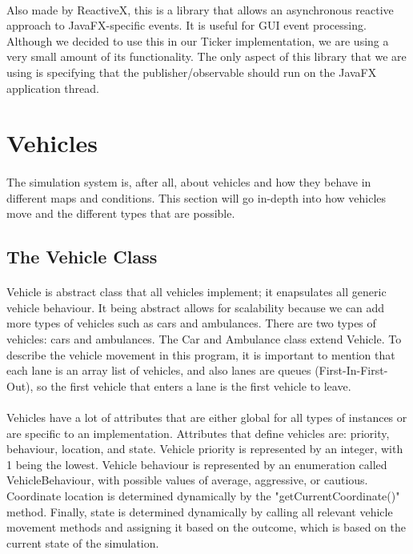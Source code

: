 \documentclass[a4paper,11pt,titlepage]{article}
\begin{document}
\paragraph{}
Also made by ReactiveX, this is a library that allows an asynchronous reactive approach to JavaFX-specific events. It is useful for GUI event processing. Although we decided to use this in our Ticker implementation, we are using a very small amount of its functionality. The only aspect of this library that we are using is specifying that the publisher/observable should run on the JavaFX application thread.

\section{Vehicles}
\paragraph{}
The simulation system is, after all, about vehicles and how they behave in different maps and conditions. This section will go in-depth into how vehicles move and the different types that are possible.
\subsection{The Vehicle Class}
\paragraph{}
Vehicle is abstract class that all vehicles implement; it enapsulates all generic vehicle behaviour. It being abstract allows for scalability because we can add more types of vehicles such as cars and ambulances. There are two types of vehicles: cars and ambulances. The Car and Ambulance class extend Vehicle. To describe the vehicle movement in this program, it is important to mention that each lane is an array list of vehicles, and also lanes are queues (First-In-First-Out), so the first vehicle that enters a lane is the first vehicle to leave.   
\paragraph{}
Vehicles have a lot of attributes that are either global for all types of instances or are specific to an implementation. Attributes that define vehicles are: priority, behaviour, location, and state. Vehicle priority is represented by an integer, with 1 being the lowest. Vehicle behaviour is represented by an enumeration called VehicleBehaviour, with possible values of average, aggressive, or cautious. Coordinate location is determined dynamically by the "getCurrentCoordinate()" method. Finally, state is determined dynamically by calling all relevant vehicle movement methods and assigning it based on the outcome, which is based on the current state of the simulation.
\end{document}
